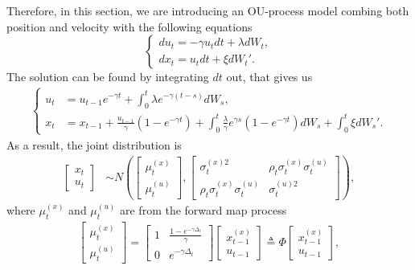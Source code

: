 Therefore, in this section, we are introducing an OU-process model combing both position and velocity with the following equations  
\begin{equation}\label{OUprocess}
\begin{cases}
du_t = -\gamma u_t dt+ \lambda dW_t,\\
dx_t = u_t dt+\xi dW_t'.
\end{cases}
\end{equation}
The solution can be found by integrating $dt$ out, that gives us 
\begin{align}
\begin{cases}
u_t &=u_{t-1}e^{-\gamma t} +\int_{0}^{t} \lambda e^{-\gamma (t-s)}dW_s,\\
x_t &=x_{t-1} +\frac{u_{t-1}}{\gamma}(1- e^{-\gamma t}) + \int_{0}^{t} \frac{\lambda}{\gamma}e^{\gamma  s} \left(1-e^{-\gamma t}\right)dW_s + \int_{0}^{t}\xi dW_s'.
\end{cases}
\end{align}
As a result, the joint distribution is 
\begin{align}
\begin{bmatrix} x_t \\ u_t \end{bmatrix} &\sim N\left(
\begin{bmatrix}\mu_t^{(x)} \\ \mu_t^{(u)}  \end{bmatrix} , 
\begin{bmatrix}
\sigma_t^{(x)2} & \rho_t\sigma_t^{(x)} \sigma_t^{(u)} \\
\rho_t\sigma_t^{(x)} \sigma_t^{(u)} & \sigma_t^{(u)2}
\end{bmatrix} \right),
\end{align}
where $\mu_t^{(x)}$ and $\mu_t^{(u)} $ are from the forward map process 
\begin{align}
\begin{bmatrix}\mu_t^{(x)} \\ \mu_t^{(u)}  \end{bmatrix}  = 
\begin{bmatrix}
1 & \frac{1-e^{-\gamma \Delta_t}}{\gamma} \\ 0 &  e^{-\gamma \Delta_t}
\end{bmatrix}  \begin{bmatrix} x_{t-1}^{(x)} \\ u_{t-1}  \end{bmatrix} \triangleq \Phi \begin{bmatrix} x_{t-1}^{(x)} \\ u_{t-1}  \end{bmatrix},
\end{align}
